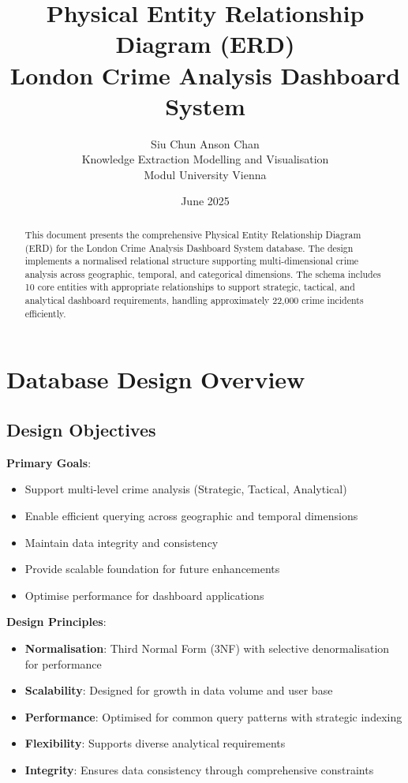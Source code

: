 \documentclass[12pt,a4paper]{article}
\title{\textbf{Physical Entity Relationship Diagram (ERD)\\London Crime Analysis Dashboard System}}
\author{Siu Chun Anson Chan \\ Knowledge Extraction Modelling and Visualisation \\ Modul University Vienna}
\date{June 2025}
\begin{document}
\maketitle
\thispagestyle{fancy}

\begin{abstract}
This document presents the comprehensive Physical Entity Relationship Diagram (ERD) for the London Crime Analysis Dashboard System database. The design implements a normalised relational structure supporting multi-dimensional crime analysis across geographic, temporal, and categorical dimensions. The schema includes 10 core entities with appropriate relationships to support strategic, tactical, and analytical dashboard requirements, handling approximately 22,000 crime incidents efficiently.
\end{abstract}

\tableofcontents
\newpage

\section{Database Design Overview}

\subsection{Design Objectives}

\textbf{Primary Goals}:
\begin{itemize}
    \item Support multi-level crime analysis (Strategic, Tactical, Analytical)
    \item Enable efficient querying across geographic and temporal dimensions
    \item Maintain data integrity and consistency
    \item Provide scalable foundation for future enhancements
    \item Optimise performance for dashboard applications
\end{itemize}

\textbf{Design Principles}:
\begin{itemize}
    \item \textbf{Normalisation}: Third Normal Form (3NF) with selective denormalisation for performance
    \item \textbf{Scalability}: Designed for growth in data volume and user base
    \item \textbf{Performance}: Optimised for common query patterns with strategic indexing
    \item \textbf{Flexibility}: Supports diverse analytical requirements
    \item \textbf{Integrity}: Ensures data consistency through comprehensive constraints
\end{itemize}
\end{document}
